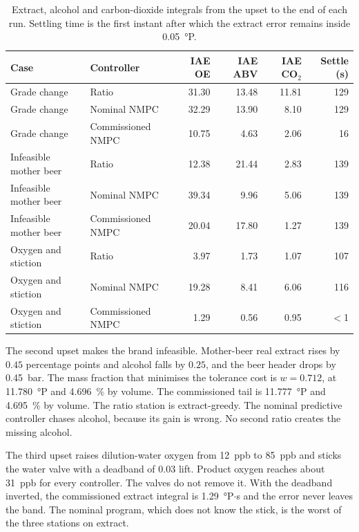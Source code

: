 \documentclass[11pt,a4paper]{article}
\begin{document}
\begin{table}[t]
\centering
\caption{Extract, alcohol and carbon-dioxide integrals from the upset to the end of each run. Settling time is the first instant after which the extract error remains inside \SI{0.05}{\degree}P.}
\label{tab:kpi}
\scriptsize
\setlength{\tabcolsep}{3.2pt}
\begin{tabular}{@{}llrrrr@{}}
\toprule
Case & Controller & IAE OE & IAE ABV & IAE CO$_2$ & Settle (s) \\
\midrule
Grade change & Ratio & 31.30 & 13.48 & 11.81 & 129 \\
Grade change & Nominal NMPC & 32.29 & 13.90 & 8.10 & 129 \\
Grade change & Commissioned NMPC & 10.75 & 4.63 & 2.06 & 16 \\
Infeasible mother beer & Ratio & 12.38 & 21.44 & 2.83 & 139 \\
Infeasible mother beer & Nominal NMPC & 39.34 & 9.96 & 5.06 & 139 \\
Infeasible mother beer & Commissioned NMPC & 20.04 & 17.80 & 1.27 & 139 \\
Oxygen and stiction & Ratio & 3.97 & 1.73 & 1.07 & 107 \\
Oxygen and stiction & Nominal NMPC & 19.28 & 8.41 & 6.06 & 116 \\
Oxygen and stiction & Commissioned NMPC & 1.29 & 0.56 & 0.95 & $<$1 \\
\bottomrule
\end{tabular}
\end{table}

The second upset makes the brand infeasible. Mother-beer real extract rises by $0.45$ percentage points and alcohol falls by $0.25$, and the beer header drops by \SI{0.45}{bar}. The mass fraction that minimises the tolerance cost is $w=0.712$, at \SI{11.780}{\degree}P and \SI{4.696}{\percent} by volume. The commissioned tail is \SI{11.777}{\degree}P and \SI{4.695}{\percent} by volume. The ratio station is extract-greedy. The nominal predictive controller chases alcohol, because its gain is wrong. No second ratio creates the missing alcohol.

The third upset raises dilution-water oxygen from \SI{12}{ppb} to \SI{85}{ppb} and sticks the water valve with a deadband of $0.03$ lift. Product oxygen reaches about \SI{31}{ppb} for every controller. The valves do not remove it. With the deadband inverted, the commissioned extract integral is \SI{1.29}{\degree}P$\cdot$s and the error never leaves the band. The nominal program, which does not know the stick, is the worst of the three stations on extract.
\end{document}
